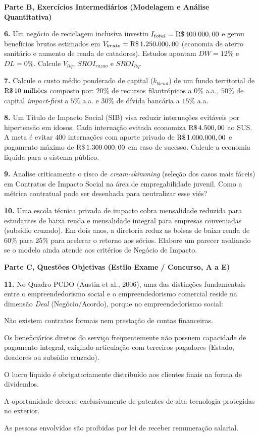 \textbf{Parte B, Exercícios Intermediários (Modelagem e Análise Quantitativa)}

\textbf{6.} Um negócio de reciclagem inclusiva investiu $I_{total} = \text{R\$\,}{400.000,00}$ e gerou benefícios brutos estimados em $V_{bruto} = \text{R\$\,}{1.250.000,00}$ (economia de aterro sanitário e aumento de renda de catadores). Estudos apontam $DW = 12\%$ e $DL = 0\%$. Calcule $V_{liq}$, $SROI_{razao}$ e $SROI_{liq}$.
\espacoResolucao[2.0cm]

\textbf{7.} Calcule o custo médio ponderado de capital ($k_{blend}$) de um fundo territorial de $\text{R\$\,}{10\text{ milhões}}$ composto por: $20\%$ de recursos filantrópicos a $0\%$ a.a., $50\%$ de capital \textit{impact-first} a $5\%$ a.a. e $30\%$ de dívida bancária a $15\%$ a.a.
\espacoResolucao[2.0cm]

\textbf{8.} Um Título de Impacto Social (SIB) visa reduzir internações evitáveis por hipertensão em idosos. Cada internação evitada economiza $\text{R\$\,}{4.500,00}$ ao SUS. A meta é evitar $400$ internações com aporte privado de $\text{R\$\,}{1.000.000,00}$ e pagamento máximo de $\text{R\$\,}{1.300.000,00}$ em caso de sucesso. Calcule a economia líquida para o sistema público.
\espacoResolucao[2.0cm]

\textbf{9.} Analise criticamente o risco de \textit{cream-skimming} (seleção dos casos mais fáceis) em Contratos de Impacto Social na área de empregabilidade juvenil. Como a métrica contratual pode ser desenhada para neutralizar esse viés?
\espacoResolucao[2.0cm]

\textbf{10.} Uma escola técnica privada de impacto cobra mensalidade reduzida para estudantes de baixa renda e mensalidade integral para empresas conveniadas (subsídio cruzado). Em dois anos, a diretoria reduz as bolsas de baixa renda de $60\%$ para $25\%$ para acelerar o retorno aos sócios. Elabore um parecer avaliando se o modelo ainda atende aos critérios de Negócio de Impacto.
\espacoResolucao[2.0cm]

\textbf{Parte C, Questões Objetivas (Estilo Exame / Concurso, A a E)}

\textbf{11.} No Quadro PCDO (Austin et al., 2006), uma das distinções fundamentais entre o empreendedorismo social e o empreendedorismo comercial reside na dimensão \textit{Deal} (Negócio/Acordo), porque no empreendedorismo social:
\begin{alternativas}
  \item Não existem contratos formais nem prestação de contas financeiras.
  \item Os beneficiários diretos do serviço frequentemente não possuem capacidade de pagamento integral, exigindo articulação com terceiros pagadores (Estado, doadores ou subsídio cruzado).
  \item O lucro líquido é obrigatoriamente distribuído aos clientes finais na forma de dividendos.
  \item A oportunidade decorre exclusivamente de patentes de alta tecnologia protegidas no exterior.
  \item As pessoas envolvidas são proibidas por lei de receber remuneração salarial.
\end{alternativas}

